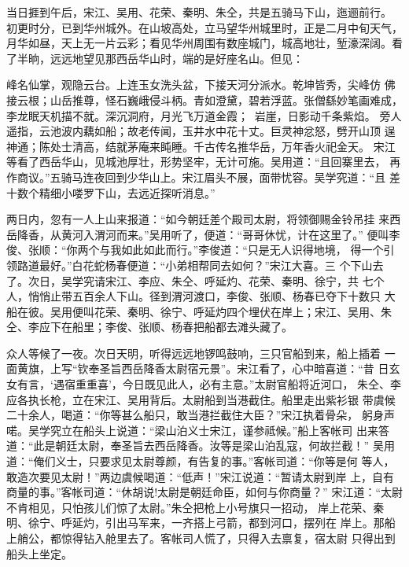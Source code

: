 当日捱到午后，宋江、吴用、花荣、秦明、朱仝，共是五骑马下山，迤逦前行。
初更时分，已到华州城外。在山坡高处，立马望华州城里时，正是二月中旬天气，
月华如昼，天上无一片云彩；看见华州周围有数座城门，城高地壮，堑濠深阔。看
了半晌，远远地望见那西岳华山时，端的是好座名山。但见：

峰名仙掌，观隐云台。上连玉女洗头盆，下接天河分派水。乾坤皆秀，尖峰仿
佛接云根；山岳推尊，怪石巍峨侵斗柄。青如澄黛，碧若浮蓝。张僧繇妙笔画难成，
李龙眠天机描不就。深沉洞府，月光飞万道金霞；岩崖，日影动千条紫焰。
旁人遥指，云池波内藕如船；故老传闻，玉井水中花十丈。巨灵神忿怒，劈开山顶
逞神通；陈处士清高，结就茅庵来盹睡。千古传名推华岳，万年香火祀金天。
宋江等看了西岳华山，见城池厚壮，形势坚牢，无计可施。吴用道：“且回寨里去，
再作商议。”五骑马连夜回到少华山上。宋江眉头不展，面带忧容。吴学究道：“且
差十数个精细小喽罗下山，去远近探听消息。”

两日内，忽有一人上山来报道：“如今朝廷差个殿司太尉，将领御赐金铃吊挂
来西岳降香，从黄河入渭河而来。”吴用听了，便道：“哥哥休忧，计在这里了。”
便叫李俊、张顺：“你两个与我如此如此而行。”李俊道：“只是无人识得地境，
得一个引领路道最好。”白花蛇杨春便道：“小弟相帮同去如何？”宋江大喜。三
个下山去了。次日，吴学究请宋江、李应、朱仝、呼延灼、花荣、秦明、徐宁，共
七个人，悄悄止带五百余人下山。径到渭河渡口，李俊、张顺、杨春已夺下十数只
大船在彼。吴用便叫花荣、秦明、徐宁、呼延灼四个埋伏在岸上；宋江、吴用、朱
仝、李应下在船里；李俊、张顺、杨春把船都去滩头藏了。

众人等候了一夜。次日天明，听得远远地锣鸣鼓响，三只官船到来，船上插着
一面黄旗，上写“钦奉圣旨西岳降香太尉宿元景”。宋江看了，心中暗喜道：“昔
日玄女有言，‘遇宿重重喜’，今日既见此人，必有主意。”太尉官船将近河口，
朱仝、李应各执长枪，立在宋江、吴用背后。太尉船到当港截住。船里走出紫衫银
带虞候二十余人，喝道：“你等甚么船只，敢当港拦截住大臣？”宋江执着骨朵，
躬身声喏。吴学究立在船头上说道：“梁山泊义士宋江，谨参祗候。”船上客帐司
出来答道：“此是朝廷太尉，奉圣旨去西岳降香。汝等是梁山泊乱寇，何故拦截！”
吴用道：“俺们义士，只要求见太尉尊颜，有告复的事。”客帐司道：“你等是何
等人，敢造次要见太尉！”两边虞候喝道：“低声！”宋江说道：“暂请太尉到岸
上，自有商量的事。”客帐司道：“休胡说!太尉是朝廷命臣，如何与你商量？”
宋江道：“太尉不肯相见，只怕孩儿们惊了太尉。”朱仝把枪上小号旗只一招动，
岸上花荣、秦明、徐宁、呼延灼，引出马军来，一齐搭上弓箭，都到河口，摆列在
岸上。那船上艄公，都惊得钻入舱里去了。客帐司人慌了，只得入去禀复，宿太尉
只得出到船头上坐定。

